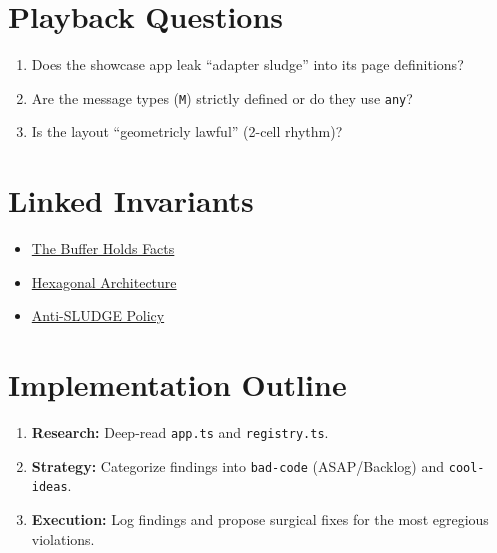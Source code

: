 \section{Playback Questions}\label{record-252-playback-questions}

\begin{enumerate}
\def\labelenumi{\arabic{enumi}.}
\tightlist
\item
  Does the showcase app leak ``adapter sludge'' into its page definitions?
\item
  Are the message types (\texttt{M}) strictly defined or do they use \texttt{a\allowbreak{}n\allowbreak{}y}?
\item
  Is the layout ``geometricly lawful'' (2-cell rhythm)?
\end{enumerate}

\section{Linked Invariants}\label{record-252-linked-invariants}

\begin{itemize}
\tightlist
\item
  \href{https://github.com/flyingrobots/bijou/blob/cbd70612140e7a450d764b3c7be1c6af878b99bc/invariants/buffer-holds-facts.md}{The Buffer Holds Facts}
\item
  \href{https://github.com/flyingrobots/bijou/blob/cbd70612140e7a450d764b3c7be1c6af878b99bc/ARCHITECTURE.md}{Hexagonal Architecture}
\item
  \href{https://github.com/flyingrobots/bijou/blob/cbd70612140e7a450d764b3c7be1c6af878b99bc/docs/method/backlog/badcode/bad-code.md}{Anti-SLUDGE Policy}
\end{itemize}

\section{Implementation Outline}\label{record-252-implementation-outline}

\begin{enumerate}
\def\labelenumi{\arabic{enumi}.}
\tightlist
\item
  \textbf{Research:} Deep-read \texttt{a\allowbreak{}p\allowbreak{}p\allowbreak{}.\allowbreak{}t\allowbreak{}s} and \texttt{r\allowbreak{}e\allowbreak{}g\allowbreak{}i\allowbreak{}s\allowbreak{}t\allowbreak{}r\allowbreak{}y\allowbreak{}.\allowbreak{}t\allowbreak{}s}.
\item
  \textbf{Strategy:} Categorize findings into \texttt{b\allowbreak{}a\allowbreak{}d\allowbreak{}-\allowbreak{}c\allowbreak{}o\allowbreak{}d\allowbreak{}e} (ASAP/Backlog) and \texttt{c\allowbreak{}o\allowbreak{}o\allowbreak{}l\allowbreak{}-\allowbreak{}i\allowbreak{}d\allowbreak{}e\allowbreak{}a\allowbreak{}s}.
\item
  \textbf{Execution:} Log findings and propose surgical fixes for the most egregious violations.
\end{enumerate}

